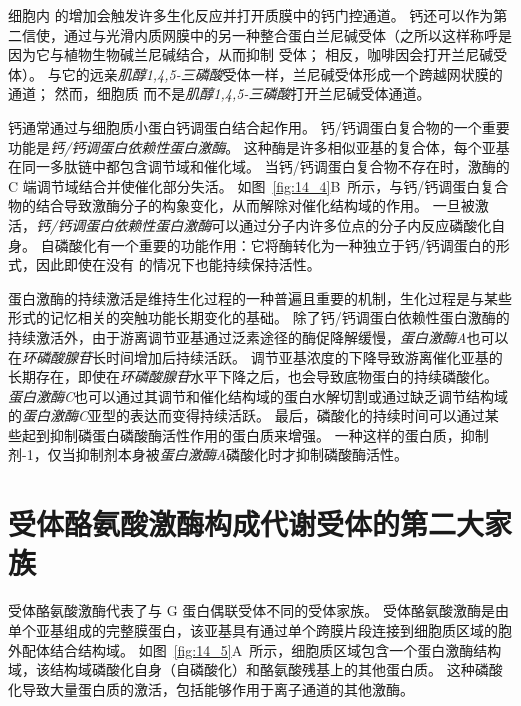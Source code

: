 细胞内  的增加会触发许多生化反应并打开质膜中的钙门控通道。
钙还可以作为第二信使，通过与光滑内质网膜中的另一种整合蛋白兰尼碱受体（之所以这样称呼是因为它与植物生物碱兰尼碱结合，从而抑制 受体；
相反，咖啡因会打开兰尼碱受体）。
与它的远亲\textit{肌醇1,4,5-三磷酸}受体一样，兰尼碱受体形成一个跨越网状膜的  通道；
然而，细胞质  而不是\textit{肌醇1,4,5-三磷酸}打开兰尼碱受体通道。


钙通常通过与细胞质小蛋白钙调蛋白结合起作用。
钙/钙调蛋白复合物的一个重要功能是\textit{钙/钙调蛋白依赖性蛋白激酶}。
这种酶是许多相似亚基的复合体，每个亚基在同一多肽链中都包含调节域和催化域。
当钙/钙调蛋白复合物不存在时，激酶的 C 端调节域结合并使催化部分失活。
如图~\ref{fig:14_4}B~所示，与钙/钙调蛋白复合物的结合导致激酶分子的构象变化，从而解除对催化结构域的作用。
一旦被激活，\textit{钙/钙调蛋白依赖性蛋白激酶}可以通过分子内许多位点的分子内反应磷酸化自身。
自磷酸化有一个重要的功能作用：它将酶转化为一种独立于钙/钙调蛋白的形式，因此即使在没有  的情况下也能持续保持活性。


蛋白激酶的持续激活是维持生化过程的一种普遍且重要的机制，生化过程是与某些形式的记忆相关的突触功能长期变化的基础。
除了钙/钙调蛋白依赖性蛋白激酶的持续激活外，由于游离调节亚基通过泛素途径的酶促降解缓慢，\textit{蛋白激酶A}也可以在\textit{环磷酸腺苷}长时间增加后持续活跃。
调节亚基浓度的下降导致游离催化亚基的长期存在，即使在\textit{环磷酸腺苷}水平下降之后，也会导致底物蛋白的持续磷酸化。
\textit{蛋白激酶C}也可以通过其调节和催化结构域的蛋白水解切割或通过缺乏调节结构域的\textit{蛋白激酶C}亚型的表达而变得持续活跃。
最后，磷酸化的持续时间可以通过某些起到抑制磷蛋白磷酸酶活性作用的蛋白质来增强。
一种这样的蛋白质，抑制剂-1，仅当抑制剂本身被\textit{蛋白激酶A}磷酸化时才抑制磷酸酶活性。



\section{受体酪氨酸激酶构成代谢受体的第二大家族}

受体酪氨酸激酶代表了与 G 蛋白偶联受体不同的受体家族。
受体酪氨酸激酶是由单个亚基组成的完整膜蛋白，该亚基具有通过单个跨膜片段连接到细胞质区域的胞外配体结合结构域。
如图~\ref{fig:14_5}A~所示，细胞质区域包含一个蛋白激酶结构域，该结构域磷酸化自身（自磷酸化）和酪氨酸残基上的其他蛋白质。
这种磷酸化导致大量蛋白质的激活，包括能够作用于离子通道的其他激酶。


